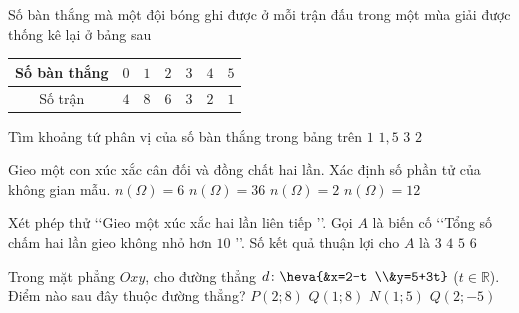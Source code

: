\begin{ex}%
Số bàn thắng mà một đội bóng ghi được ở mỗi trận đấu trong một mùa giải được thống kê lại ở bảng sau
\begin{center}
\begin{tabular}{|c|c|c|c|c|c|c|}
\hline
Số bàn thắng&$0$&$1$&$2$&$3$&$4$&$5$\\
\hline
Số trận&$4$&$8$&$6$&$3$&$2$&$1$\\
\hline
\end{tabular}
\end{center}
Tìm khoảng tứ phân vị của số bàn thắng trong bảng trên
\choice
{$1$}
{\True $1{,}5$}
{$3$}
{$2$}
\end{ex}

\begin{ex}%
Gieo một con xúc xắc cân đối và đồng chất hai lần. Xác định số phần tử của không gian mẫu.
\choice
{$ n\left(\Omega\right)=6$}
{\True $ n\left(\Omega\right)=36$}
{$ n\left(\Omega\right)=2$}
{$ n\left(\Omega\right)=12$}
\end{ex}

\begin{ex}%
Xét phép thử  \lq\lq Gieo một xúc xắc hai lần liên tiếp \rq\rq. Gọi $A$ là biến cố \lq\lq Tổng số chấm hai lần gieo không nhỏ hơn $10$ \rq\rq. Số kết quả thuận lợi cho $A$ là
\choice
{$3$}
{\True $4$}
{$5$}
{$6$}
\end{ex}

\begin{ex}%
Trong mặt phẳng $Oxy$, cho đường thẳng $d\colon\heva{&x=2-t \\&y=5+3t}$ ($t\in\mathbb{R}$). Điểm nào sau đây thuộc đường thẳng?
\choice
{$P(2;8)$}
{\True $Q(1;8)$}
{$N(1;5)$}
{$Q(2;-5)$}
\end{ex}

